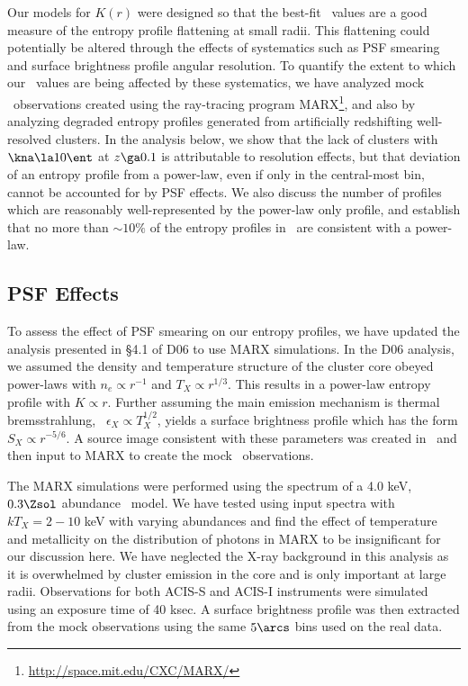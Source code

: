 \documentclass{emulateapj}
\begin{document}
Our models for $K(r)$ were designed so that the best-fit \kna\ values
are a good measure of the entropy profile flattening at small
radii. This flattening could potentially be altered through the
effects of systematics such as PSF smearing and surface brightness
profile angular resolution. To quantify the extent to which our
\kna\ values are being affected by these systematics, we have analyzed
mock \chandra\ observations created using the ray-tracing program
MARX\footnote{\url{http://space.mit.edu/CXC/MARX/}}, and also by
analyzing degraded entropy profiles generated from artificially
redshifting well-resolved clusters. In the analysis below, we show
that the lack of clusters with $\kna \la 10 \ent$ at $z \ga 0.1$ is
attributable to resolution effects, but that deviation of an entropy
profile from a power-law, even if only in the central-most bin, cannot
be accounted for by PSF effects. We also discuss the number of
profiles which are reasonably well-represented by the power-law only
profile, and establish that no more than $\sim 10\%$ of the entropy
profiles in \accept\ are consistent with a power-law.

\subsection{PSF Effects}
\label{sec:psf}

To assess the effect of PSF smearing on our entropy profiles, we have
updated the analysis presented in \S4.1 of D06 to use MARX
simulations. In the D06 analysis, we assumed the density and
temperature structure of the cluster core obeyed power-laws with $n_e
\propto r^{-1}$ and $T_X \propto r^{1/3}$. This results in a power-law
entropy profile with $K \propto r$. Further assuming the main emission
mechanism is thermal bremsstrahlung, \ie\ $\epsilon_X \propto
T_X^{1/2}$, yields a surface brightness profile which has the form
$S_X \propto r^{-5/6}$. A source image consistent with these
parameters was created in \idl\ and then input to MARX to create the
mock \chandra\ observations.

The MARX simulations were performed using the spectrum of a 4.0 keV,
$0.3 \Zsol$ abundance \mekal\ model. We have tested using input
spectra with $kT_X = 2-10$ keV with varying abundances and find the
effect of temperature and metallicity on the distribution of photons
in MARX to be insignificant for our discussion here. We have neglected
the X-ray background in this analysis as it is overwhelmed by cluster
emission in the core and is only important at large
radii. Observations for both ACIS-S and ACIS-I instruments were
simulated using an exposure time of 40 ksec. A surface brightness
profile was then extracted from the mock observations using the same
$5\arcs$ bins used on the real data.
\end{document}
